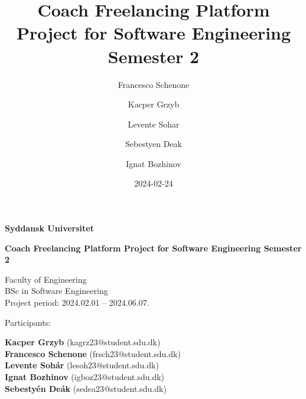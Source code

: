 \title{Coach Freelancing Platform Project for Software Engineering Semester 2}
\author{Francesco Schenone \and Kacper Grzyb \and Levente Sohar \and Sebestyen Deak \and Ignat Bozhinov}
\date{2024-02-24}
\begin{titlepage}
\centering
\vspace*{1cm}

\Huge
\textbf{Syddansk Universitet}

\vspace{2cm}

\Huge
\textbf{Coach Freelancing Platform Project}
\textbf{for Software Engineering Semester 2}

\vfill

\large
Faculty of Engineering\\
BSc in Software Engineering\\
Project period: 2024.02.01 -- 2024.06.07.

\vfill
\begin{flushleft}
    Participants: \\
\end{flushleft}

    \hfill \small{\textbf{Kacper Grzyb} (kagrz23@student.sdu.dk)} \\
    \hfill \small{\textbf{Francesco Schenone} (frsch23@student.sdu.dk)} \\
    \hfill \small{\textbf{Levente Sohár} (lesoh23@student.sdu.dk)} \\
    \hfill \small{\textbf{Ignat Bozhinov} (igboz23@student.sdu.dk)} \\
    \hfill \small{\textbf{Sebestyén Deák} (sedea23@student.sdu.dk)} \\

\end{titlepage}
